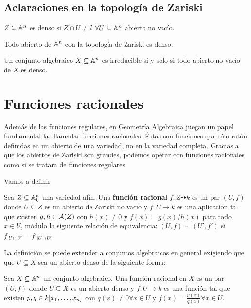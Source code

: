 \documentclass[ACGA.tex]{subfiles}
\begin{document}
\subsection{Aclaraciones en la topología de Zariski}
\begin{defi} $Z\subseteq\mathbb{A}^n$ es denso si $Z\cap U\neq\emptyset$ $\forall U\subseteq\mathbb{A}^n$ abierto no vacío.
\end{defi}

\begin{prop} Todo abierto de $\mathbb{A}^n$ con la topología de Zariski es denso.
\end{prop}

\begin{prop}
Un conjunto algebraico $X\subseteq\mathbb{A}^n$ es irreducible si y solo si todo abierto no vacío de $X$ es denso.
\end{prop}

\section{Funciones racionales}
Además de las funciones regulares, en Geometría Algebraica juegan un papel fundamental las llamadas funciones racionales. Éstas son funciones que sólo están definidas en un abierto de una variedad, no en la variedad completa. Gracias a que los abiertos de Zariski son grandes, podemos operar con funciones racionales como si se tratara de funciones regulares.

Vamos a definir 
\begin{defi}
 Sea $Z\subseteq\mathbb{A}^n_k$ una variedad afín. Una {\bf función racional} $f:Z\dashrightarrow k$ es un par $(U,f)$ donde $U\subseteq Z$ es un abierto de Zariski no vacío y $f:U\to k$ es una aplicación tal que existen $g,h\in \mathcal{A}(Z)$ con $h(x)\neq 0$ y $f(x)=g(x)/h(x)$ para todo $x\in U$, módulo la siguiente relación de equivalencia: $(U,f)\sim(U',f')$ si $f_{\mid U\cap U'}=f'_{|U\cap U'}$.
\end{defi}


La definición se puede extender a conjuntos algebraicos en general exigiendo que que $U\subseteq X$ sea un abierto denso de la siguiente forma:

\begin{defi}
Sea $X\subseteq\mathbb{A}^n$ un conjunto algebraico. Una función racional en $X$ es un par $(U,f)$ donde $U\subseteq X$ es un abierto denso y $f:U\to k$ es una función tal que existen $p,q\in k[x_1,\dotsc,x_{n}]$ con $q(x)\neq 0\forall x\in U$ y $f(x)=\frac{p(x)}{q(x)}\forall x\in U$. 
\end{defi}
\end{document}
